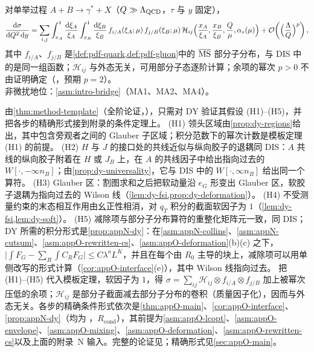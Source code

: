 \begin{theorem}\label{thm:dy-factorization}
对单举过程 $A+B\to\gamma^*+X$（$Q\gg\Lambda_{\mathrm{QCD}}$，$\tau$ 与 $y$ 固定），
\begin{equation}\label{eq:dy-factorization}
\frac{\mathrm{d}\sigma}{\mathrm{d} Q^2\,\mathrm{d} y}=\sum_{i,j}\int_{x_A}^1\frac{\mathrm{d}\xi_A}{\xi_A}\int_{x_B}^1\frac{\mathrm{d}\xi_B}{\xi_B}\,f_{i/A}(\xi_A;\mu)\,f_{j/B}(\xi_B;\mu)\,\mathcal H_{ij}\Big(\frac{x_A}{\xi_A},\frac{x_B}{\xi_B},\frac Q\mu,\alpha_s(\mu)\Big)+\mathcal{O}\!\left(\Big(\frac{\Lambda}{Q}\Big)^p\right),
\end{equation}
其中 $f_{i/A}$、$f_{j/B}$ 是\cref{def:pdf-quark,def:pdf-gluon}中的 $\overline{\mathrm{MS}}$ 部分子分布，与 DIS 中的是同一组函数；$\mathcal H_{ij}$ 与外态无关，可用部分子态逐阶计算；余项的幂次 $p>0$ 不由证明确定（\tagC，预期 $p=2$）。\\
非微扰地位：\cref{asm:intro-bridge}（MA1、MA2、MA4）。
\end{theorem}

\begin{proofsketch}
由\cref{thm:method-template}（全阶论证，\tagA），只需对 DY 验证其假设 (H1)--(H5)，并把各步的精确形式接到附录的条件定理上。
(H1) 领头区域由\cref{prop:dy-regions}给出，其中包含旁观者之间的 Glauber 子区域；积分范数下的幂次计数是模板定理 (H1) 的前提。
(H2) $H$ 与 $J$ 的接口处的共线近似与纵向胶子的退耦同 DIS：$A$ 共线的纵向胶子附着在 $H$ 或 $J_B$ 上，在 $A$ 的共线因子中给出指向过去的 $W[\cdot,-\infty n_B]$；由\cref{prop:dy-universality}，它与 DIS 中的 $W[\cdot,\infty n_B]$ 给出同一个算符。
(H3) Glauber 区：割图求和之后把软动量沿 $e_G$ 形变出 Glauber 区，软胶子退耦为指向过去的 Wilson 线（\cref{lem:dy-fsi,prop:dy-deformation}）。
(H4) 不受测量约束的末态相互作用由幺正性相消，对 $q_T$ 积分的截面软因子为 $1$（\cref{lem:dy-fsi,lem:dy-soft}）。
(H5) 减除项与部分子分布算符的重整化矩阵元一致，同 DIS；DY 所需的积分形式是\cref{prop:appN-dy}：在\cref{asm:appN-collins}、\cref{asm:appN-cutsum}、\cref{asm:appO-rewritten-cs}、\cref{asm:appO-deformation}(b)(c) 之下，$\big|\int F_G-\sum_R\int C_RF_G\big|\le C\lambda^aL^K$，并且在每个由 $R_0$ 主导的块上，减除项可以用单侧改写的形式计算（\cref{cor:appO-interface}(e)），其中 Wilson 线指向过去。
把 (H1)--(H5) 代入模板定理，软因子为 $1$，得 $\sigma=\sum_{ij}\mathcal H_{ij}\otimes f_{i/A}\otimes f_{j/B}$ 加上被幂次压低的余项；$\mathcal H_{ij}$ 是部分子截面减去部分子分布的卷积（质量因子化），因而与外态无关。各步的精确条件形式依次是\cref{thm:appO-main}、\cref{cor:appO-interface}、\cref{prop:appN-dy}（均为 \tagR，$R_{\mathrm{cond}}$），其前提为\cref{asm:appO-lcopt}、\cref{asm:appO-envelope}、\cref{asm:appO-mixing}、\cref{asm:appO-deformation}、\cref{asm:appO-rewritten-cs}以及上面的附录~N 输入。完整的论证见\cite[第~14.4~节]{Collins2011}；精确形式见\cref{sec:appO-main}。
\end{proofsketch}

